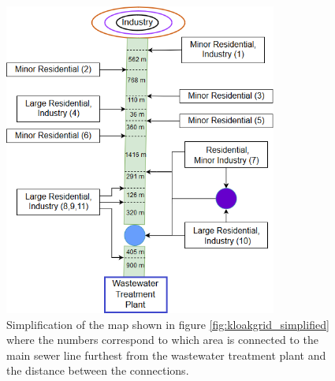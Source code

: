 \begin{figure}[H]
\centering
\includegraphics[width=0.8\textwidth]{report/system_overview/pictures/sewer_line_diagram2.png}
\caption{Simplification of the map shown in figure \ref{fig:kloakgrid_simplified} where the numbers correspond to which area is connected to the main sewer line furthest from the wastewater treatment plant and the distance between the connections.}
\label{fig:sewer_line_diagram}
\end{figure}